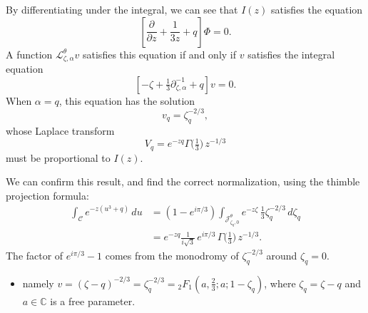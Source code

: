 \documentclass{article}
\newcommand{\C}{\mathbb{C}}
\newcommand{\laplace}{\mathcal{L}}
\theoremstyle{definition}
\theoremstyle{plain}
\newenvironment{brainstorm}{\color{BlueViolet}\begin{itemize}}{\end{itemize}\color{black}}
\begin{document}
\begin{itemize}
By differentiating under the integral, we can see that $I(z)$ satisfies the equation
\begin{equation}\label{eqn:degree-3-poly-1root}
\left[\frac{\partial}{\partial z} + \frac{1}{3z} +q \right] \Phi = 0.
\end{equation}
A function $\laplace_{\zeta,\alpha}^{\theta} v$ satisfies this equation if and only if $v$ satisfies the integral equation
\[ \left[ -\zeta + \tfrac{1}{3} \partial^{-1}_{\zeta, \alpha} +q  \right] v = 0. \]
When $\alpha = q$, this equation has the solution
\[ v_q = \zeta_q^{-2/3}, \]
whose Laplace transform
\[ V_q = e^{-zq} \Gamma\big(\tfrac{1}{3})\,z^{-1/3} \]
must be proportional to $I(z)$.

We can confirm this result, and find the correct normalization, using the thimble projection formula:
\begin{align*}
\int_{\mathcal{C}} e^{-z(u^3+q)}\,du & = (1 - e^{i\pi/3}) \int_{\mathcal{J}_{\zeta_q, 0}^\theta} e^{-z\zeta}\,\tfrac{1}{3}\zeta_q^{-2/3}\,d\zeta_q \\
& = e^{-zq}\tfrac{1}{i\sqrt{3}}\,e^{i\pi/3}\,\Gamma\big(\tfrac{1}{3})\,z^{-1/3}.
\end{align*}
The factor of $e^{i\pi/3} - 1$ comes from the monodromy of $\zeta_q^{-2/3}$ around $\zeta_q = 0$. 
\begin{brainstorm}
\item namely $v=(\zeta-q)^{-2/3}=\zeta_q^{-2/3}={}_2F_1\left(a,\frac{2}{3};a;1-\zeta_q\right)$, where $\zeta_q=\zeta-q$ and $a\in\C$ is a free parameter.
\end{brainstorm}
\end{itemize}
\end{document}
